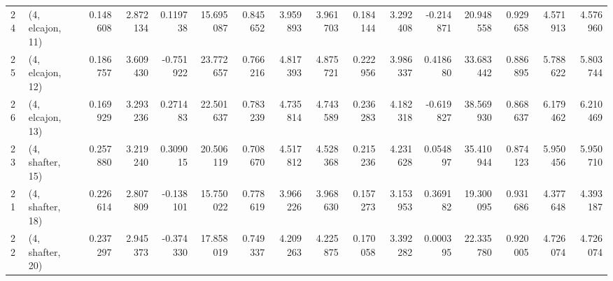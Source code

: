 \begin{tabular}{llrrrrrrrrrrrrrr}
24 &  (4, elcajon, 11) &   0.148608 &  2.872134 &  0.119738 &  15.695087 &  0.845652 &   3.959893 &  3.961703 &  0.184144 &  3.292408 & -0.214871 &   20.948558 &  0.929658 &   4.571913 &   4.576960 \\
25 &  (4, elcajon, 12) &   0.186757 &  3.609430 & -0.751922 &  23.772657 &  0.766216 &   4.817393 &  4.875721 &  0.222956 &  3.986337 &  0.418680 &   33.683442 &  0.886895 &   5.788622 &   5.803744 \\
26 &  (4, elcajon, 13) &   0.169929 &  3.293236 &  0.271483 &  22.501637 &  0.783239 &   4.735814 &  4.743589 &  0.236283 &  4.182318 & -0.619827 &   38.569930 &  0.868637 &   6.179462 &   6.210469 \\
23 &  (4, shafter, 15) &   0.257880 &  3.219240 &  0.309015 &  20.506119 &  0.708670 &   4.517812 &  4.528368 &  0.215236 &  4.231628 &  0.054897 &   35.410944 &  0.874123 &   5.950456 &   5.950710 \\
21 &  (4, shafter, 18) &   0.226614 &  2.807809 & -0.138101 &  15.750022 &  0.778619 &   3.966226 &  3.968630 &  0.157273 &  3.153953 &  0.369182 &   19.300095 &  0.931686 &   4.377648 &   4.393187 \\
22 &  (4, shafter, 20) &   0.237297 &  2.945373 & -0.374330 &  17.858019 &  0.749337 &   4.209263 &  4.225875 &  0.170058 &  3.392282 &  0.000395 &   22.335780 &  0.920005 &   4.726074 &   4.726074 \\
\bottomrule
\end{tabular}
